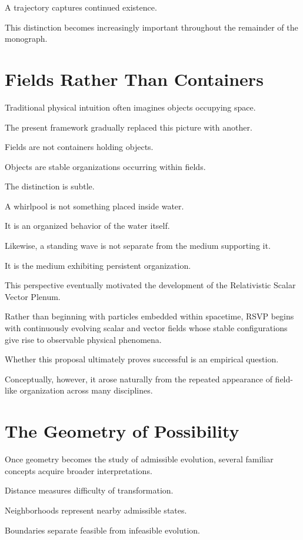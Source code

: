 \documentclass[11pt,oneside]{book}
\numberwithin{equation}{chapter}
\theoremstyle{definition}
\theoremstyle{plain}
\begin{document}
A trajectory captures continued existence.

This distinction becomes increasingly important throughout the remainder of
the monograph.

\section{Fields Rather Than Containers}

Traditional physical intuition often imagines objects occupying space.

The present framework gradually replaced this picture with another.

Fields are not containers holding objects.

Objects are stable organizations occurring within fields.

The distinction is subtle.

A whirlpool is not something placed inside water.

It is an organized behavior of the water itself.

Likewise, a standing wave is not separate from the medium supporting it.

It is the medium exhibiting persistent organization.

This perspective eventually motivated the development of the Relativistic
Scalar Vector Plenum.

Rather than beginning with particles embedded within spacetime, RSVP begins
with continuously evolving scalar and vector fields whose stable
configurations give rise to observable physical phenomena.

Whether this proposal ultimately proves successful is an empirical question.

Conceptually, however, it arose naturally from the repeated appearance of
field-like organization across many disciplines.

\section{The Geometry of Possibility}

Once geometry becomes the study of admissible evolution, several familiar
concepts acquire broader interpretations.

Distance measures difficulty of transformation.

Neighborhoods represent nearby admissible states.

Boundaries separate feasible from infeasible evolution.
\end{document}
